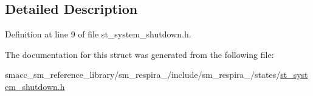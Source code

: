 \subsection{Detailed Description}


Definition at line 9 of file st\+\_\+system\+\_\+shutdown.\+h.



The documentation for this struct was generated from the following file\+:\begin{DoxyCompactItemize}
\item 
smacc\+\_\+sm\+\_\+reference\+\_\+library/sm\+\_\+respira\+\_/include/sm\+\_\+respira\+\_/states/\hyperlink{st__system__shutdown_8h}{st\+\_\+system\+\_\+shutdown.\+h}\end{DoxyCompactItemize}
